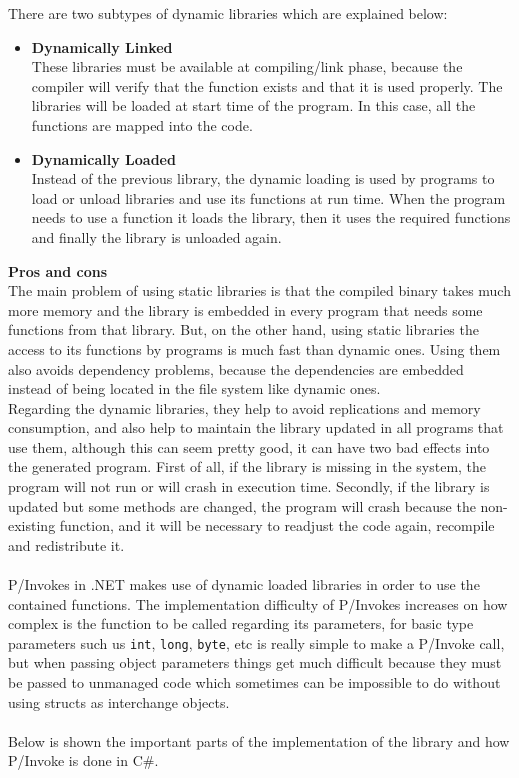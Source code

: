 \begin{itemize}
There are two subtypes of dynamic libraries which are explained below:
  \begin{itemize}
    \item 
    \textbf{Dynamically Linked}
  	\\
  	These libraries must be available at compiling/link phase, because the compiler will verify that the function exists and that it is used properly. The libraries will be loaded at start time of the program. In this case, all the functions are mapped into the code.
    \item
    \textbf{Dynamically Loaded}
    \\
    Instead of the previous library, the dynamic loading is used by programs to load or unload libraries and use its functions at run time. When the program needs to use a function it loads the library, then it uses the required functions and finally the library is unloaded again.
    \end{itemize}
\end{itemize}

\textbf{Pros and cons}
\\
The main problem of using static libraries is that the compiled binary takes much more memory and the library is embedded in every program that needs some functions from that library. But, on the other hand, using static libraries the access to its functions by programs is much fast than dynamic ones. Using them also avoids dependency problems, because the dependencies are embedded instead of being located in the file system like dynamic ones.
\\
Regarding the dynamic libraries, they help to avoid replications and memory consumption, and also help to maintain the library updated in all programs that use them, although this can seem pretty good, it can have two bad effects into the generated program. First of all, if the library is missing in the system, the program will not run or will crash in execution time. Secondly, if the library is updated but some methods are changed, the program will crash because the non-existing function, and it will be necessary to readjust the code again, recompile and redistribute it.
\\
\\
P/Invokes in .NET makes use of dynamic loaded libraries in order to use the contained functions. The implementation difficulty of P/Invokes increases on how complex is the function to be called regarding its parameters, for basic type parameters such us \verb!int!, \verb!long!, \verb!byte!, etc is really simple to make a P/Invoke call, but when passing object parameters things get much difficult because they must be passed to unmanaged code which sometimes can be impossible to do without using structs as interchange objects.
\\
\\
Below is shown the important parts of the implementation of the library and how P/Invoke is done in C\#.

